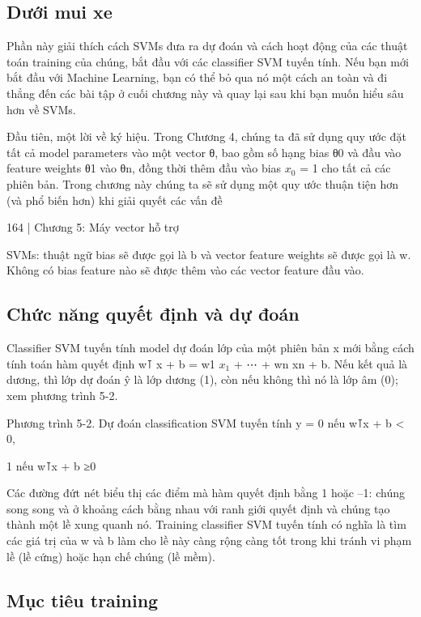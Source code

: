 \subsection{Dưới mui xe}

Phần này giải thích cách SVMs đưa ra dự đoán và cách hoạt động của các thuật toán training của chúng, bắt đầu với các classifier SVM tuyến tính. Nếu bạn mới bắt đầu với Machine Learning, bạn có thể bỏ qua nó một cách an toàn và đi thẳng đến các bài tập ở cuối chương này và quay lại sau khi bạn muốn hiểu sâu hơn về SVMs.

Đầu tiên, một lời về ký hiệu. Trong Chương 4, chúng ta đã sử dụng quy ước đặt tất cả model parameters vào một vector θ, bao gồm số hạng bias θ0 và đầu vào feature weights θ1 vào θn, đồng thời thêm đầu vào bias $x_{0}$ = 1 cho tất cả các phiên bản. Trong chương này chúng ta sẽ sử dụng một quy ước thuận tiện hơn (và phổ biến hơn) khi giải quyết các vấn đề

164 | Chương 5: Máy vector hỗ trợ

SVMs: thuật ngữ bias sẽ được gọi là b và vector feature weights sẽ được gọi là w. Không có bias feature nào sẽ được thêm vào các vector feature đầu vào.

\subsection{Chức năng quyết định và dự đoán}

Classifier SVM tuyến tính model dự đoán lớp của một phiên bản x mới bằng cách tính toán hàm quyết định w⊺ x + b = w1 $x_{1}$ + ⋯ + wn xn + b. Nếu kết quả là dương, thì lớp dự đoán ŷ là lớp dương (1), còn nếu không thì nó là lớp âm (0); xem phương trình 5-2.

Phương trình 5-2. Dự đoán classification SVM tuyến tính y = 0 nếu w⊺x + b < 0,

1 nếu w⊺x + b ≥0

Các đường đứt nét biểu thị các điểm mà hàm quyết định bằng 1 hoặc –1: chúng song song và ở khoảng cách bằng nhau với ranh giới quyết định và chúng tạo thành một lề xung quanh nó. Training classifier SVM tuyến tính có nghĩa là tìm các giá trị của w và b làm cho lề này càng rộng càng tốt trong khi tránh vi phạm lề (lề cứng) hoặc hạn chế chúng (lề mềm).

\subsection{Mục tiêu training}

